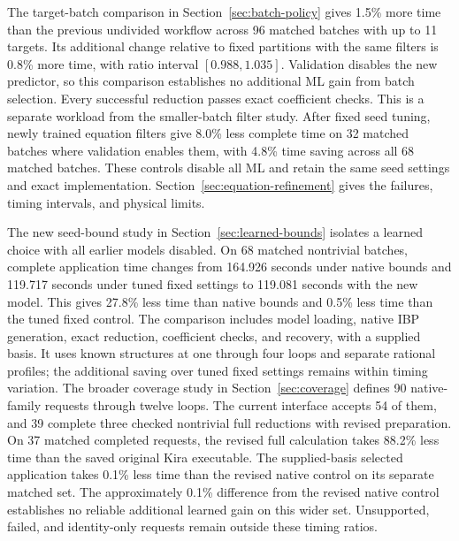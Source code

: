 The target-batch comparison in Section~\ref{sec:batch-policy} gives 1.5\% more time than the previous undivided workflow across 96 matched batches with up to 11 targets. Its additional change relative to fixed partitions with the same filters is 0.8\% more time, with ratio interval $[0.988, 1.035]$. Validation disables the new predictor, so this comparison establishes no additional ML gain from batch selection. Every successful reduction passes exact coefficient checks. This is a separate workload from the smaller-batch filter study.
After fixed seed tuning, newly trained equation filters give 8.0\% less complete time on 32 matched batches where validation enables them, with 4.8\% time saving across all 68 matched batches. These controls disable all ML and retain the same seed settings and exact implementation. Section~\ref{sec:equation-refinement} gives the failures, timing intervals, and physical limits.

The new seed-bound study in Section~\ref{sec:learned-bounds} isolates a learned choice with all earlier models disabled. On 68 matched nontrivial batches, complete application time changes from 164.926 seconds under native bounds and 119.717 seconds under tuned fixed settings to 119.081 seconds with the new model. This gives 27.8\% less time than native bounds and 0.5\% less time than the tuned fixed control. The comparison includes model loading, native IBP generation, exact reduction, coefficient checks, and recovery, with a supplied basis. It uses known structures at one through four loops and separate rational profiles; the additional saving over tuned fixed settings remains within timing variation.
The broader coverage study in Section~\ref{sec:coverage} defines 90 native-family requests through twelve loops. The current interface accepts 54 of them, and 39 complete three checked nontrivial full reductions with revised preparation. On 37 matched completed requests, the revised full calculation takes 88.2\% less time than the saved original Kira executable. The supplied-basis selected application takes 0.1\% less time than the revised native control on its separate matched set. The approximately 0.1\% difference from the revised native control establishes no reliable additional learned gain on this wider set. Unsupported, failed, and identity-only requests remain outside these timing ratios.

